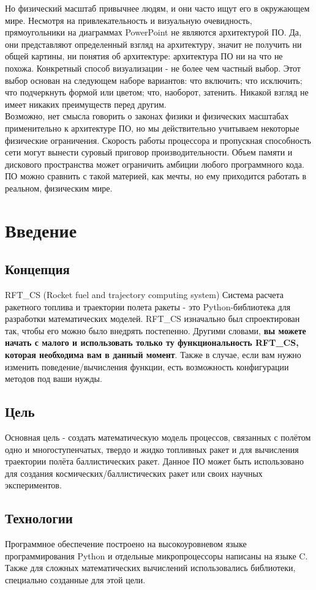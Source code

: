 \documentclass[a4paper, 12pt]{report}
\begin{document}
{    Но физический масштаб привычнее людям, и они часто ищут его в окружающем мире. Несмотря на привлекательность и визуальную очевидность, прямоугольники на диаграммах PowerPoint не являются архитектурой ПО. Да, они представляют определенный взгляд на архитектуру, значит не получить ни общей картины, ни понятия об архитектуре: архитектура ПО ни на что не похожа.
    Конкретный способ визуализации - не более чем частный выбор. Этот выбор основан на следующем наборе вариантов: что включить; что исключить; что подчеркнуть формой или цветом; что, наоборот, затенить. Никакой взгляд не имеет никаких преимуществ перед другим.\\
    Возможно, нет смысла говорить о законах физики и физических масштабах применительно к архитектуре ПО, но мы действительно учитываем некоторые физические ограничения. Скорость работы процессора и пропускная способность сети могут вынести суровый приговор производительности. Объем памяти и дискового пространства может ограничить амбиции любого программного кода. ПО можно сравнить с такой материей, как мечты, но ему приходится работать в реальном, физическим мире.
}

\chapter{Введение}
\section{Концепция}
\textrm{
    RFT\_CS (Rocket fuel and trajectory computing system) Система расчета ракетного топлива и траектории полета ракеты - это Python-библиотека для разработки математических моделей. RFT\_CS изначально был спроектирован так, чтобы его можно было внедрять постепенно. Другими словами, \textbf{вы можете начать с малого и использовать только ту функциональность RFT\_CS, которая необходима вам в данный момент}. Также в случае, если вам нужно изменить поведение/вычисления функции, есть возможность конфигурации методов под ваши нужды.
}
\section{Цель}
\textrm{
    Основная цель - создать математическую модель процессов, связанных с полётом одно и многоступенчатых, твердо и жидко топливных ракет и для вычисления траектории полёта баллистических ракет. Данное ПО может быть использовано для создания космических/баллистических ракет или своих научных экспериментов.
}
\section{Технологии}
\textrm{
    Программное обеспечение построено на высокоуровневом языке программирования Python и отдельные микропроцессоры написаны на языке C. Также для сложных математических вычислений использовались библиотеки, специально созданные для этой цели.
}
\clearpage
\end{document}
